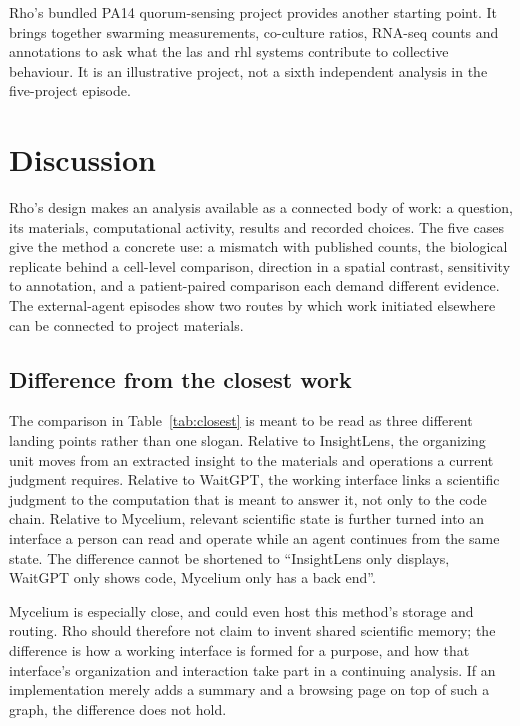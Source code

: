 \documentclass[11pt]{article}
\begin{document}
Rho's bundled PA14 quorum-sensing project \cite{pa14} provides another starting point. It brings together swarming measurements, co-culture ratios, RNA-seq counts and annotations to ask what the las and rhl systems contribute to collective behaviour. It is an illustrative project, not a sixth independent analysis in the five-project episode.

\section{Discussion}\label{discussion}

Rho's design makes an analysis available as a connected body of work: a question, its materials, computational activity, results and recorded choices. The five cases give the method a concrete use: a mismatch with published counts, the biological replicate behind a cell-level comparison, direction in a spatial contrast, sensitivity to annotation, and a patient-paired comparison each demand different evidence. The external-agent episodes show two routes by which work initiated elsewhere can be connected to project materials.

\subsection{Difference from the closest work}\label{difference}

The comparison in Table~\ref{tab:closest} is meant to be read as three different landing points rather than one slogan. Relative to InsightLens, the organizing unit moves from an extracted insight to the materials and operations a current judgment requires. Relative to WaitGPT, the working interface links a scientific judgment to the computation that is meant to answer it, not only to the code chain. Relative to Mycelium, relevant scientific state is further turned into an interface a person can read and operate while an agent continues from the same state. The difference cannot be shortened to ``InsightLens only displays, WaitGPT only shows code, Mycelium only has a back end''.

Mycelium is especially close, and could even host this method's storage and routing. Rho should therefore not claim to invent shared scientific memory; the difference is how a working interface is formed for a purpose, and how that interface's organization and interaction take part in a continuing analysis. If an implementation merely adds a summary and a browsing page on top of such a graph, the difference does not hold.
\end{document}
